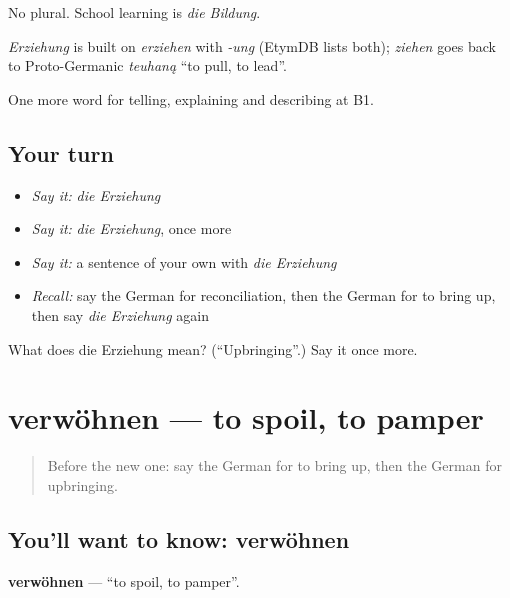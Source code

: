 No plural. School learning is \emph{die Bildung}.

\begin{cousinweb}
\emph{Erziehung} is built on \emph{erziehen} with \emph{-ung} (EtymDB lists both); \emph{ziehen} goes back to Proto-Germanic \emph{teuhaną} \textquotedblleft{}to pull, to lead\textquotedblright{}.
\end{cousinweb}

\begin{grammarlens}[title={What you've built}]
One more word for telling, explaining and describing at B1.
\end{grammarlens}

\subsection*{Your turn}
\begin{itemize}
\raggedright
  \item \emph{Say it:} \emph{die Erziehung}
  \item \emph{Say it:} \emph{die Erziehung}, once more
  \item \emph{Say it:} a sentence of your own with \emph{die Erziehung}
  \item \emph{Recall:} say the German for reconciliation, then the German for to bring up, then say \emph{die Erziehung} again
\end{itemize}

\begin{tcolorbox}[breakable,colback=teal!4,colframe=teal!35!black,title={Before you move on}]
What does die Erziehung mean? (\textquotedblleft{}Upbringing\textquotedblright{}.) Say it once more.
\end{tcolorbox}
\section[verwöhnen]{verwöhnen — to spoil, to pamper}

\label{lesson:GE-C495-verwoehnen}



\begin{quote}
Before the new one: say the German for to bring up, then the German for upbringing.
\end{quote}

\subsection*{You'll want to know: verwöhnen}
\textbf{verwöhnen} — \textquotedblleft{}to spoil, to pamper\textquotedblright{}.

